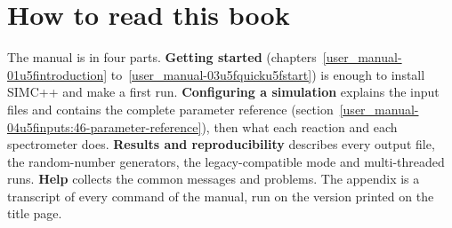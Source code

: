 \section*{How to read this book}
The manual is in four parts. \textbf{Getting started} (chapters~\ref{user_manual-01u5fintroduction}
to~\ref{user_manual-03u5fquicku5fstart}) is enough to install SIMC++ and make a first run. \textbf{Configuring a
simulation} explains the input files and contains the complete parameter reference
(section~\ref{user_manual-04u5finputs:46-parameter-reference}), then what each reaction and each spectrometer does.
\textbf{Results and reproducibility} describes every output file, the random-number generators, the
legacy-compatible mode and multi-threaded runs. \textbf{Help} collects the common messages and problems. The appendix
is a transcript of every command of the manual, run on the version printed on the title page.
